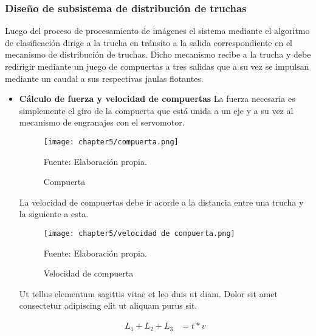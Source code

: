 



\subsubsection{Diseño de subsistema de distribución de truchas}

Luego del proceso de procesamiento de imágenes el sistema mediante el algoritmo de clasificación dirige a la trucha en tránsito a la salida correspondiente en el mecanismo de distribución de truchas. Dicho mecanismo recibe a la trucha y debe redirigir mediante un juego de compuertas a tres salidas que a su vez se impulsan mediante un caudal a sus respectivas jaulas flotantes.

\begin{itemize}
	
	\item \textbf{Cálculo de fuerza y velocidad de compuertas}
	La fuerza necesaria es simplemente el giro de la compuerta que está unida a un eje y a su vez al mecanismo de engranajes con el servomotor.
	
	\begin{figure}[H]
		\centering
		\texttt{[image: chapter5/compuerta.png]}
		\caption{Compuerta}
		\begin{myflushleftportland}
			Fuente: Elaboración propia.
		\end{myflushleftportland}
		\label{fig:compuerta}
	\end{figure}
	
	La velocidad de compuertas debe ir acorde a la distancia entre una trucha y la siguiente a esta. 
	
	\begin{figure}[H]
		\centering
		\texttt{[image: chapter5/velocidad de compuerta.png]}
		\caption{Velocidad de compuerta}
		\begin{myflushleftportland}
			Fuente: Elaboración propia.
		\end{myflushleftportland}
		\label{fig:velocidad de compuerta}
	\end{figure}

	Ut tellus elementum sagittis vitae et leo duis ut diam. Dolor sit amet consectetur adipiscing elit ut aliquam purus sit. 
	
	\begin{equation}\label{eq:calculo de tiempo necesario}
		\begin{split}
			L_1+L_2+L_3 &= t * v
		\end{split}		
	\end{equation}


\end{itemize}
